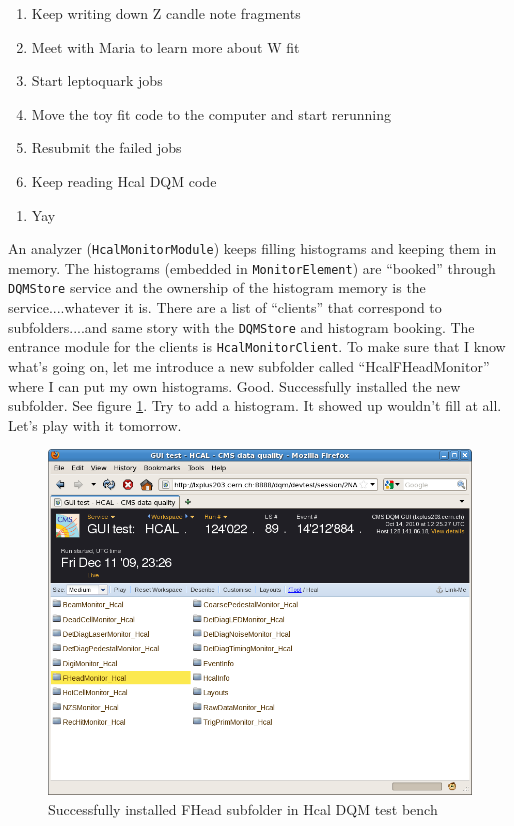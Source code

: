 

\begin{enumerate}
\item Keep writing down Z candle note fragments
\item Meet with Maria to learn more about W fit
\item Start leptoquark jobs
\item Move the toy fit code to the computer and start rerunning
\item Resubmit the failed jobs
\item Keep reading Hcal DQM code
\end{enumerate}


\begin{enumerate}
\item Yay
\end{enumerate}


An analyzer (\texttt{HcalMonitorModule}) keeps filling histograms and keeping them in memory.
The histograms (embedded in \texttt{MonitorElement}) are ``booked'' through \texttt{DQMStore} service and the ownership of the histogram memory is the service....whatever it is.
There are a list of ``clients'' that correspond to subfolders....and same story with the \texttt{DQMStore} and histogram booking.
The entrance module for the clients is \texttt{HcalMonitorClient}.  To make sure that I know what's going on,
let me introduce a new subfolder called ``HcalFHeadMonitor'' where I can put my own histograms.
Good.  Successfully installed the new subfolder.  See figure \ref{Figure_6314InstalledFHeadMonitorScreenShot}.
Try to add a histogram.  It showed up wouldn't fill at all.  Let's play with it tomorrow.

\begin{figure}
\includegraphics[width=120mm]{DailyLog/6314/6314HcalFHeadMonitor.png}
\caption{Successfully installed FHead subfolder in Hcal DQM test bench}
\label{Figure_6314InstalledFHeadMonitorScreenShot}
\end{figure}

